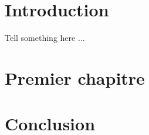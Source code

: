 \documentclass[UTF8]{EPURapport}
\begin{document}
\chapter{Introduction}

Tell something here ...

\chapter{Premier chapitre}

\chapter{Conclusion}

\annexes
\end{document}
